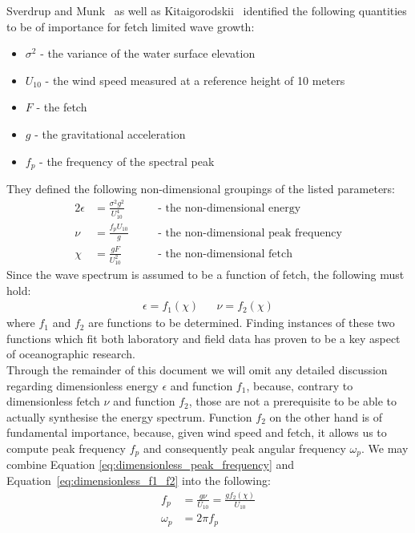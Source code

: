 Sverdrup and Munk~\cite{report:SverdrupMunk1947} as well as
Kitaigorodskii~\cite{article:Kitaigorodskii1962}\cite{book:Kitaigorodskii1970} 
identified the following quantities to be of importance for fetch limited wave
growth:
\begin{itemize}
 \item $\sigma^2$ - the variance of the water surface elevation
 \item $U_{10}$ - the wind speed measured at a reference height of 10 meters
 \item $F$ - the fetch
 \item $g$ - the gravitational acceleration
 \item $f_p$ - the frequency of the spectral peak
\end{itemize}
They defined the following non-dimensional groupings of the listed parameters:
\begin{alignat}{2}
 \epsilon &= \frac{\sigma^2 g^2}{U_{10}^{4}} \quad && \text{- the 
non-dimensional energy}\\
 \nu &= \frac{f_p U_{10}}{g} \quad && \text{- the non-dimensional peak 
frequency} \label{eq:dimensionless_peak_frequency} \\
 \chi &= \frac{gF}{U_{10}^{2}} \quad && \text{- the non-dimensional fetch} 
\label{eq:dimensionless_fetch}
\end{alignat}
Since the wave spectrum is assumed to be a function of fetch, the following 
must hold: 
\begin{align}
\label{eq:dimensionless_f1_f2}
 \epsilon = f_1(\chi) && \nu = f_2(\chi)
\end{align}
where $f_1$ and $f_2$ are functions to be determined. Finding instances of 
these two functions which fit both laboratory and field data has proven to be a 
key aspect of oceanographic research.\\

Through the remainder of 
this document we will omit any detailed discussion regarding dimensionless 
energy $\epsilon$ and function $f_1$, because, contrary to 
dimensionless fetch $\nu$ and function $f_2$, those are not a prerequisite to 
be able to actually synthesise the energy spectrum. Function $f_2$ on the other 
hand is of fundamental importance, because, given wind speed and fetch, it 
allows us to compute peak frequency $f_p$ and consequently peak angular 
frequency $\omega_p$. We may combine Equation 
\ref{eq:dimensionless_peak_frequency} and Equation~\ref{eq:dimensionless_f1_f2}
into the following:
\begin{align}
 f_p &= \frac{g\nu}{U_{10}} = \frac{gf_2(\chi)}{U_{10}} 
\label{eq:f_p_from_dimensionless}\\
 \omega_p &= 2\pi f_p \label{eq:omega_p_from_dimensionless}
\end{align}
%
